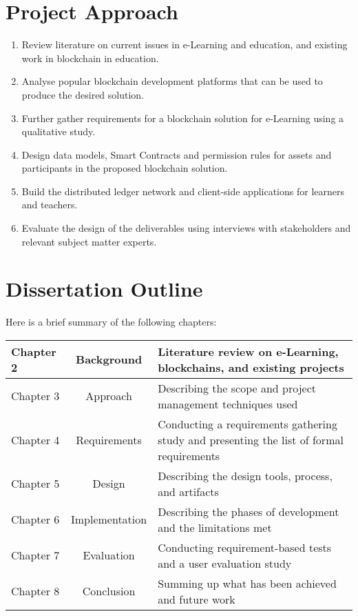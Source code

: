 \section{Project Approach} %

\begin{enumerate}
	\setlength\itemsep{0em}
	\item Review literature on current issues in e-Learning and education, and existing work in blockchain in education.
	\item Analyse popular blockchain development platforms that can be used to produce the desired solution.
	\item Further gather requirements for a blockchain solution for e-Learning using a qualitative study.
	\item Design data models, Smart Contracts and permission rules for assets and participants in the proposed blockchain solution.
	\item Build the distributed ledger network and client-side applications for learners and teachers.
	\item Evaluate the design of the deliverables using interviews with stakeholders and relevant subject matter experts.
\end{enumerate}

\section{Dissertation Outline}  %

Here is a brief summary of the following chapters:

\begin{table}[ht]
	\centering    
	\begin{tabularx}{\textwidth}{lcX}
		\toprule
		Chapter 2 & Background     & Literature review on e-Learning, blockchains, and existing projects                      \\
		\midrule
		Chapter 3 & Approach       & Describing the scope and project management techniques used\\
		\midrule
		Chapter 4 & Requirements   & Conducting a requirements gathering study and presenting the list of formal requirements \\
		\midrule
		Chapter 5 & Design         & Describing the design tools, process, and artifacts                                      \\
		\midrule
		Chapter 6 & Implementation & Describing the phases of development and the limitations met                             \\
		\midrule
		Chapter 7 & Evaluation     & Conducting requirement-based tests and a user evaluation study                           \\
		\midrule
		Chapter 8 & Conclusion     & Summing up what has been achieved and future work                                        \\
		\bottomrule
	\end{tabularx}
\end{table}

